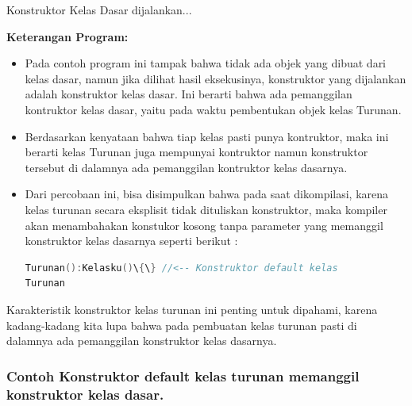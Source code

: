 \begin{lcverbatim}
Konstruktor Kelas Dasar dijalankan...
\end{lcverbatim}


\textbf{Keterangan Program:}

\begin{itemize}
\item
  Pada contoh program ini tampak bahwa tidak ada objek yang dibuat dari
  kelas dasar, namun jika dilihat hasil eksekusinya, konstruktor yang
  dijalankan adalah konstruktor kelas dasar. Ini berarti bahwa ada
  pemanggilan kontruktor kelas dasar, yaitu pada waktu pembentukan objek
  kelas Turunan.
\item
  Berdasarkan kenyataan bahwa tiap kelas pasti punya kontruktor, maka
  ini berarti kelas Turunan juga mempunyai kontruktor namun konstruktor
  tersebut di dalamnya ada pemanggilan kontruktor kelas dasarnya.
\item
  Dari percobaan ini, bisa disimpulkan bahwa pada saat dikompilasi,
  karena kelas turunan secara eksplisit tidak dituliskan konstruktor,
  maka kompiler akan menambahakan konstukor kosong tanpa parameter yang
  memanggil konstruktor kelas dasarnya seperti berikut :

\begin{lstlisting}[language=c++, numbers=none]
Turunan():Kelasku()\{\} //<-- Konstruktor default kelas
Turunan
\end{lstlisting}
  
\end{itemize}

Karakteristik konstruktor kelas turunan ini penting untuk dipahami,
karena kadang-kadang kita lupa bahwa pada pembuatan kelas turunan pasti
di dalamnya ada pemanggilan konstruktor kelas dasarnya.

\subsubsection*{Contoh  Konstruktor default kelas turunan memanggil konstruktor kelas dasar.}

